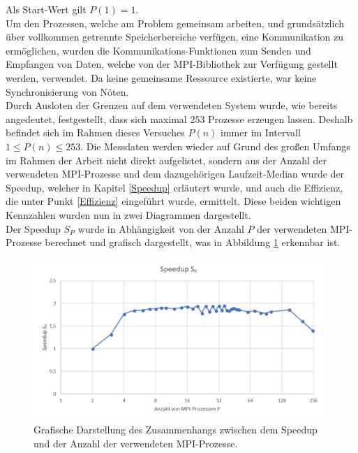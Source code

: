 \begin{description}
						Als Start-Wert gilt $P(1) = 1$.\\
						Um den Prozessen, welche am Problem gemeinsam arbeiten, und grundsätzlich über vollkommen getrennte Speicherbereiche verfügen, eine Kommunikation zu ermöglichen, wurden die Kommunikations-Funktionen zum Senden und Empfangen von Daten, welche von der MPI-Bibliothek zur Verfügung gestellt werden, verwendet. Da keine gemeinsame Ressource existierte, war keine Synchronisierung von Nöten.\\
						Durch Ausloten der Grenzen auf dem verwendeten System wurde, wie bereits angedeutet, festgestellt, dass sich maximal 253 Prozesse erzeugen lassen. Deshalb befindet sich im Rahmen dieses Versuches $P(n)$ immer im Intervall $1 \leq P(n) \leq 253$.
						Die Messdaten werden wieder auf Grund des großen Umfangs im Rahmen der Arbeit nicht direkt aufgelistet, sondern aus der Anzahl der verwendeten MPI-Prozesse und dem dazugehörigen Laufzeit-Median wurde der Speedup, welcher in Kapitel \ref{Speedup} erläutert wurde, und auch die Effizienz, die unter Punkt \ref{Effizienz} eingeführt wurde, ermittelt. Diese beiden wichtigen Kennzahlen wurden nun in zwei Diagrammen dargestellt.\\
						Der Speedup $S_P$ wurde in Abhängigkeit von der Anzahl $P$ der verwendeten MPI-Prozesse berechnet und grafisch dargestellt, was in Abbildung \ref{fig:Speedup_MPI} erkennbar ist.
						
						\begin{figure}
							\centering	
							\includegraphics[width=11cm]{Abbildungen/Speedup_MPI.png}
							\caption{Grafische Darstellung des Zusammenhangs zwischen dem Speedup und der Anzahl der verwendeten MPI-Prozesse.}
							\label{fig:Speedup_MPI}
						\end{figure}
						

\end{description}
